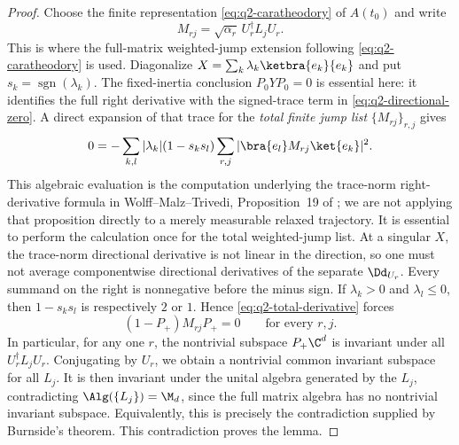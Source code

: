 \documentclass[class=article,11pt,a4paper,crop=false]{standalone}
\begin{document}
\begin{proof}
Choose the finite representation \eqref{eq:q2-caratheodory} of $A(t_0)$ and
write
\begin{equation}
  M_{rj}=\sqrt{\alpha_r}\,U_r^\dagger L_jU_r.
\end{equation}
This is where the full-matrix weighted-jump extension following
\eqref{eq:q2-caratheodory} is used. Diagonalize
$X=\sum_k\lambda_k\ketbra{e_k}{e_k}$ and put
$s_k=\operatorname{sgn}(\lambda_k)$. The fixed-inertia conclusion
$P_0YP_0=0$ is essential here: it identifies the full right derivative with
the signed-trace term in \eqref{eq:q2-directional-zero}. A direct expansion
of that trace for the \emph{total finite jump list} $\{M_{rj}\}_{r,j}$ gives
\begin{equation}
  0=-\sum_{k,l}|\lambda_k|(1-s_ks_l)
       \sum_{r,j}|\bra{e_l}M_{rj}\ket{e_k}|^2.
  \label{eq:q2-total-derivative}
\end{equation}
This algebraic evaluation is the computation underlying the trace-norm
right-derivative formula in Wolff--Malz--Trivedi, Proposition~19 of
\cite{Wolff2026Contractivity}; we are not applying that proposition directly
to a merely measurable relaxed trajectory. It is essential to perform the
calculation once for the total weighted-jump list. At a singular $X$, the
trace-norm directional derivative is not linear in the direction, so one must
not average componentwise directional derivatives of the separate
$\Dd_{U_r}$.
Every summand on the right is nonnegative before the minus sign. If
$\lambda_k>0$ and $\lambda_l\le0$, then $1-s_ks_l$ is respectively $2$ or
$1$. Hence \eqref{eq:q2-total-derivative} forces
\begin{equation}
  (1-P_+)M_{rj}P_+=0\qquad\text{for every }r,j.
  \label{eq:q2-positive-invariance}
\end{equation}
In particular, for any one $r$, the nontrivial subspace $P_+\C^d$ is invariant
under all $U_r^\dagger L_jU_r$. Conjugating by $U_r$, we obtain a nontrivial
common invariant subspace for all $L_j$. It is then invariant under the
unital algebra generated by the $L_j$, contradicting
$\Alg(\{L_j\})=\M_d$, since the full matrix algebra has no nontrivial invariant
subspace. Equivalently, this is precisely the contradiction supplied by
Burnside's theorem. This contradiction proves the lemma.
\end{proof}
\end{document}
